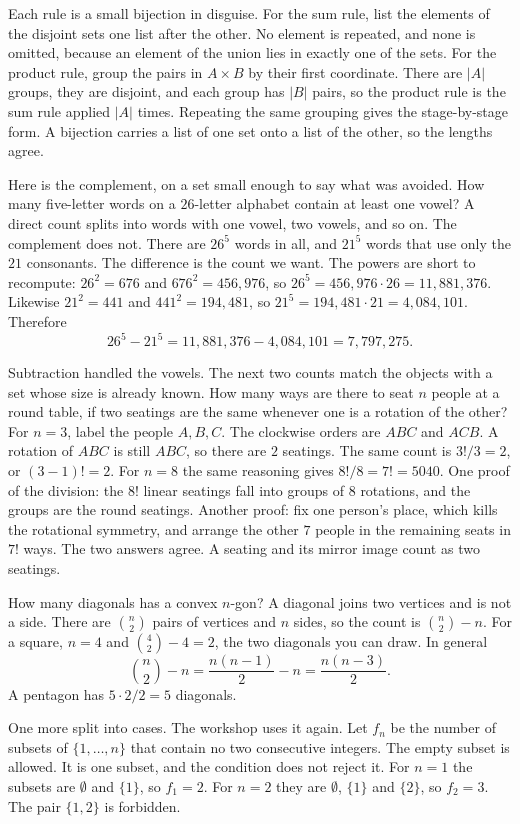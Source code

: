 Each rule is a small bijection in disguise. For the sum rule, list the elements of the disjoint sets one list after the other. No element is repeated, and none is omitted, because an element of the union lies in exactly one of the sets. For the product rule, group the pairs in $A\times B$ by their first coordinate. There are $|A|$ groups, they are disjoint, and each group has $|B|$ pairs, so the product rule is the sum rule applied $|A|$ times. Repeating the same grouping gives the stage-by-stage form. A bijection carries a list of one set onto a list of the other, so the lengths agree.

Here is the complement, on a set small enough to say what was avoided. How many five-letter words on a $26$-letter alphabet contain at least one vowel? A direct count splits into words with one vowel, two vowels, and so on. The complement does not. There are $26^5$ words in all, and $21^5$ words that use only the $21$ consonants. The difference is the count we want. The powers are short to recompute: $26^2=676$ and $676^2=456{,}976$, so $26^5=456{,}976\cdot 26=11{,}881{,}376$. Likewise $21^2=441$ and $441^2=194{,}481$, so $21^5=194{,}481\cdot 21=4{,}084{,}101$. Therefore
\[
26^5-21^5=11{,}881{,}376-4{,}084{,}101=7{,}797{,}275.
\]

Subtraction handled the vowels. The next two counts match the objects with a set whose size is already known. How many ways are there to seat $n$ people at a round table, if two seatings are the same whenever one is a rotation of the other? For $n=3$, label the people $A,B,C$. The clockwise orders are $ABC$ and $ACB$. A rotation of $ABC$ is still $ABC$, so there are $2$ seatings. The same count is $3!/3=2$, or $(3-1)!=2$. For $n=8$ the same reasoning gives $8!/8=7!=5040$. One proof of the division: the $8!$ linear seatings fall into groups of $8$ rotations, and the groups are the round seatings. Another proof: fix one person's place, which kills the rotational symmetry, and arrange the other $7$ people in the remaining seats in $7!$ ways. The two answers agree. A seating and its mirror image count as two seatings.

How many diagonals has a convex $n$-gon? A diagonal joins two vertices and is not a side. There are $\binom n2$ pairs of vertices and $n$ sides, so the count is $\binom n2-n$. For a square, $n=4$ and $\binom42-4=2$, the two diagonals you can draw. In general
\[
\binom n2-n=\frac{n(n-1)}{2}-n=\frac{n(n-3)}{2}.
\]
A pentagon has $5\cdot 2/2=5$ diagonals.

One more split into cases. The workshop uses it again. Let $f_n$ be the number of subsets of $\{1,\dots,n\}$ that contain no two consecutive integers. The empty subset is allowed. It is one subset, and the condition does not reject it. For $n=1$ the subsets are $\emptyset$ and $\{1\}$, so $f_1=2$. For $n=2$ they are $\emptyset$, $\{1\}$ and $\{2\}$, so $f_2=3$. The pair $\{1,2\}$ is forbidden.

